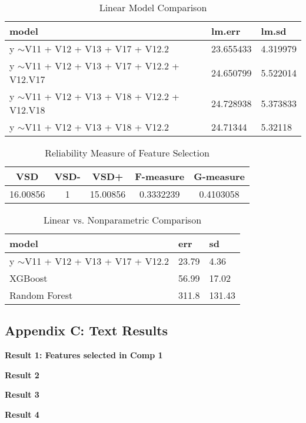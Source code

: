 \documentclass[11pt a4paper]{article}
\begin{document}
	
	\begin{table}[H]
		\centering
		\caption{Linear Model Comparison}
		\begin{tabular}{|l|l|l|}
			\hline
			model                                           & lm.err    & lm.sd    \\ \hline
			y $\sim$V11 + V12 + V13 + V17 + V12.2           & 23.655433 & 4.319979 \\ \hline
			y $\sim$V11 + V12 + V13 + V17 + V12.2 + V12.V17 & 24.650799 & 5.522014 \\ \hline
			y $\sim$V11 + V12 + V13 + V18 + V12.2 + V12.V18 & 24.728938 & 5.373833 \\ \hline
			y $\sim$V11 + V12 + V13 + V18 + V12.2           & 24.71344  & 5.32118  \\ \hline
		\end{tabular}
		\label{table:lm_comp}
	\end{table}
	
	
	
	
	\begin{table}[H]
		\centering
		\caption{Reliability Measure of Feature Selection}
		\begin{tabular}{|c|c|c|c|c|}
			\hline
			VSD & VSD- & VSD+ & F-measure & G-measure\\
			\hline
			16.00856 & 1 & 15.00856 & 0.3332239 & 0.4103058 \\
			\hline
		\end{tabular}
		\label{tab:reliability_measure}
	\end{table}
	
	
	\begin{table}[H]
		\centering
		\caption{Linear vs. Nonparametric Comparison}
		\begin{tabular}{|l|l|l|}
			\hline
			model                                 & err   & sd     \\ \hline
			y $\sim$V11 + V12 + V13 + V17 + V12.2 & 23.79 & 4.36   \\ \hline
			XGBoost                               & 56.99 & 17.02  \\ \hline
			Random Forest                         & 311.8 & 131.43 \\ \hline
		\end{tabular}
		\label{table:lm_nonparam_comp}
	\end{table}
	
	
	\subsection*{Appendix C: Text Results}
	\noindent\textbf{Result 1: Features selected in Comp 1}
	
	
	\noindent\textbf{Result 2}
	
	
	
	
	\noindent\textbf{Result 3}
	
	
	
	\noindent\textbf{Result 4}
	
	
	
	
\end{document}
